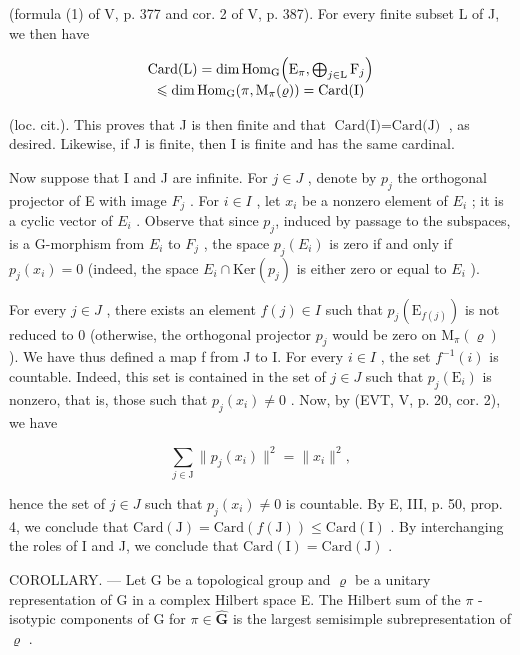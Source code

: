 (formula (1) of V, p. 377 and cor. 2 of V, p. 387). For every finite subset L of J, we then have

\[
\begin{array}{c} \operatorname{Card} (\mathrm{L}) = \dim \operatorname{Hom} _ {\mathrm{G}} \Bigl (\mathrm{E} _ {\pi}, \bigoplus_ {j \in \mathrm{L}} \mathrm{F} _ {j} \Bigr) \\ \leqslant \dim \operatorname{Hom} _ {\mathrm{G}} (\pi , \operatorname{M} _ {\pi} (\varrho)) = \operatorname{Card} (\mathrm{I}) \end{array}
\]

(loc. cit.). This proves that J is then finite and that \(\text{Card(I)} = \text{Card(J)}\) , as desired. Likewise, if J is finite, then I is finite and has the same cardinal.

Now suppose that I and J are infinite. For \(j \in J\) , denote by \(p_{j}\) the orthogonal projector of E with image \(F_{j}\) . For \(i \in I\) , let \(x_{i}\) be a nonzero element of \(E_{i}\) ; it is a cyclic vector of \(E_{i}\) . Observe that since \(p_{j}\), induced by passage to the subspaces, is a G-morphism from \(E_{i}\) to \(F_{j}\) , the space \(p_{j}(E_{i})\) is zero if and only if \(p_{j}(x_{i}) = 0\) (indeed, the space \(E_{i} \cap \text{Ker}(p_{j})\) is either zero or equal to \(E_{i}\) ).

For every \(j \in J\) , there exists an element \(f(j) \in I\) such that \(p_{j}(\mathrm{E}_{f(j)})\) is not reduced to 0 (otherwise, the orthogonal projector \(p_{j}\) would be zero on \(\mathrm{M}_{\pi}(\varrho)\) ). We have thus defined a map f from J to I. For every \(i \in I\) , the set \(f^{-1}(i)\) is countable. Indeed, this set is contained in the set of \(j \in J\) such that \(p_{j}(\mathrm{E}_{i})\) is nonzero, that is, those such that \(p_{j}(x_{i}) \neq 0\) . Now, by (EVT, V, p. 20, cor. 2), we have

\[
\sum_ {j \in \mathrm{J}} \| p _ {j} (x _ {i}) \| ^ {2} = \| x _ {i} \| ^ {2},
\]

hence the set of \(j \in J\) such that \(p_{j}(x_{i}) \neq 0\) is countable. By E, III, p. 50, prop. 4, we conclude that \(\text{Card}(\text{J}) = \text{Card}(f(\text{J})) \leqslant \text{Card}(\text{I})\) . By interchanging the roles of I and J, we conclude that \(\text{Card}(\text{I}) = \text{Card}(\text{J})\) .

COROLLARY. --- Let G be a topological group and \(\varrho\) be a unitary representation of G in a complex Hilbert space E. The Hilbert sum of the \(\pi\) -isotypic components of G for \(\pi \in \widehat{\mathbf{G}}\) is the largest semisimple subrepresentation of \(\varrho\) .

